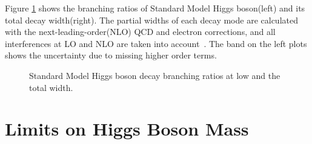 Figure \ref{fig:YRHXS2_BR_Fig1} shows the branching ratios of Standard 
Model Higgs boson(left) and its total decay width(right). The partial widths of each 
decay mode are calculated with the next-leading-order(NLO) QCD 
and electron corrections, and all interferences at LO and NLO are 
taken into account~\cite{Dittmaier:1318996}. The band on the left plots 
shows the uncertainty due to missing higher order terms. 
%
\begin{figure}[htp]
\centering
{}
\caption{Standard Model Higgs boson decay branching ratios at low \mHi 
and the total width.}
\label{fig:YRHXS2_BR_Fig1}
\end{figure}


\newpage
\section{Limits on Higgs Boson Mass} 

